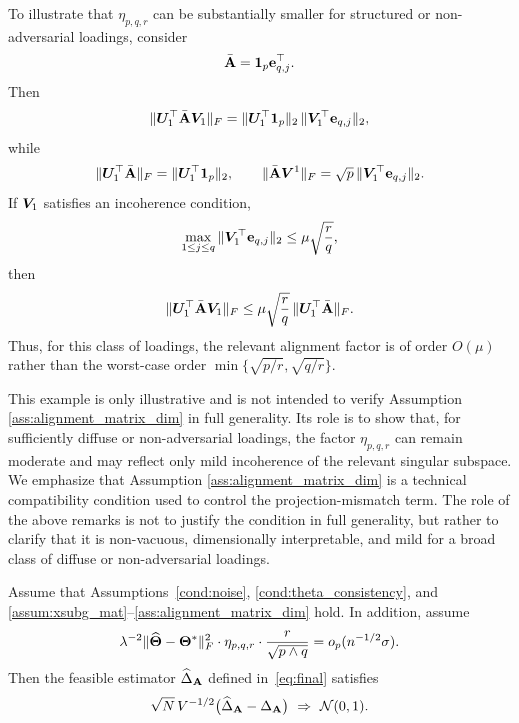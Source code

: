 \documentclass[authoryear,preprint,review,12pt]{elsarticle}
\begin{document}
{\begin{remark}
			To illustrate that $\eta_{p,q,r}$ can be substantially smaller for structured or non-adversarial loadings, consider
			\[
			\bar {\mathbf{A}}=\mathbf{1}_p \mathbf{e}_{q,j}^\top.
			\]
			Then
			\[
			\|\boldsymbol U_1^\top \bar {\mathbf{A}} \boldsymbol V_1\|_F
			=
			\|\boldsymbol U_1^\top \mathbf{1}_p\|_2\,\|\boldsymbol V_1^\top \mathbf{e}_{q,j}\|_2,
			\]
			while
			\[
			\|\boldsymbol U_1^\top \bar {\mathbf{A}}\|_F=\|\boldsymbol U_1^\top\mathbf{1}_p\|_2,
			\qquad
			\|\bar {\mathbf{A}} \boldsymbol V^1\|_F=\sqrt p\,\|\boldsymbol V_1^\top \mathbf{e}_{q,j}\|_2.
			\]
			If $\boldsymbol V_1$ satisfies an incoherence condition,
			\[
			\max_{1\le j\le q}\|\boldsymbol V_1^\top \mathbf{e}_{q,j}\|_2
			\le
			\mu\sqrt{\frac rq},
			\]
			then
			\[
			\|\boldsymbol U_1^\top \bar {\mathbf{A}} \boldsymbol V_1\|_F
			\le
			\mu\sqrt{\frac rq}\,\|\boldsymbol U_1^\top \bar {\mathbf{A}} \|_F.
			\]
			Thus, for this class of loadings, the relevant alignment factor is of order $O(\mu)$ rather than the worst-case order $\min\{\sqrt{p/r},\sqrt{q/r}\}$.
			
			This example is only illustrative and is not intended to verify Assumption \ref{ass:alignment_matrix_dim} in full generality. Its role is to show that, for sufficiently diffuse or non-adversarial loadings, the factor $\eta_{p,q,r}$ can remain moderate and may reflect only mild incoherence of the relevant singular subspace. We emphasize that Assumption \ref{ass:alignment_matrix_dim}  is a technical compatibility condition used to control the projection-mismatch term. The role of the above remarks is not to justify the condition in full generality, but rather to clarify that it is non-vacuous, dimensionally interpretable, and mild for a broad class of diffuse or non-adversarial loadings. 
		\end{remark}	
	}
	
	\begin{cor}\label{cor:asym_normal_fe}
		Assume that Assumptions~\ref{cond:noise}, \ref{cond:theta_consistency}, and
		\ref{assum:xsubg_mat}--\ref{ass:alignment_matrix_dim} hold.
		In addition, assume
		\[
		\lambda^{-2}\|\widehat{\mathbf{\Theta}}-\mathbf{\Theta}^\ast\|_F^2\cdot 	\eta_{p,q,r}\cdot\frac{r}{\sqrt{p\wedge q}}
		=
		o_p(n^{-1/2}\sigma).
		\]
		Then the feasible estimator $\widehat{\Delta}_{\mathbf{A}}$ defined in~\eqref{eq:final} satisfies
		\[
		\sqrt{N}\,V^{-1/2}\bigl(\widehat{\Delta}_{\mathbf{A}}-\Delta_{\mathbf{A}}\bigr)
		\ \Rightarrow\ \mathcal{N}(0,1).
		\]
	\end{cor}
	
\end{document}
